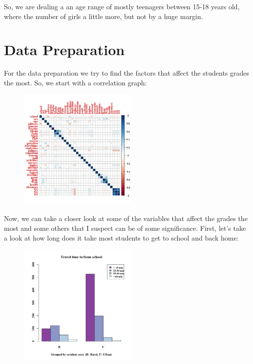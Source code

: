 \documentclass[a4paper, 11pt]{article}
\begin{document}
	So, we are dealing a an age range of mostly teenagers between 15-18 years old, where the number of girls a little more, but not by a huge margin.
	
\section{Data Preparation}
	
	For the data preparation we try to find the factors that affect the students grades the most. So, we start with a correlation graph: 
	\begin{center}
		\begin{figure}[H]
			\hspace*{1.5in}
			\includegraphics[width=222px]{correlation.jpeg}
			\label{fig:correlation}
		\end{figure}
	\end{center}
	
	Now, we can take a closer look at some of the variables that affect the grades the most and some others that I suspect can be of some significance. 
	First, let's take a look at how long does it take most students to get to school and back home:
	\begin{center}
		\begin{figure}[H]
			\hspace*{1.5in}
			\vspace*{-0.5in}
			\includegraphics[width=222px]{travel_time.jpeg}
			\label{fig:travel_time}
		\end{figure}
	\end{center}
	
\end{document}
